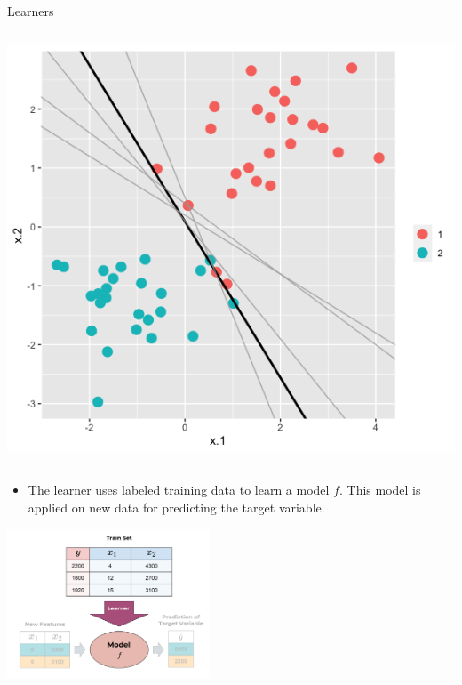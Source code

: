 \documentclass[11pt,compress,t,notes=noshow, xcolor=table]{beamer}
\begin{document}
\begin{vbframe}{Learners}
\begin{columns}
\begin{column}{0.4\textwidth}
  \begin{center}
    \includegraphics[width=\textwidth]{slides/ml-basics/figure_man/Model_Classification_Plot.png} 
  \end{center}
\end{column}    
\end{columns}  

\newpage

\begin{itemize}
\item The learner uses labeled training data to learn a model $f$. This model is applied on new data for predicting the target variable.
\end{itemize}

 \begin{center}
    \includegraphics[width = 0.45\textwidth]{figure_man/the_inducer_web.png}
  \end{center}

\end{vbframe}
\end{document}
